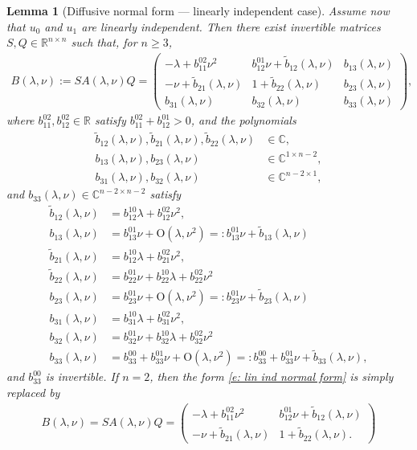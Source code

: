 \documentclass[11pt]{article}
\newcommand{\R}{\mathbb{R}}
\newcommand{\C}{\mathbb{C}}
\newtheorem{lemma}[prop]{Lemma}
\numberwithin{equation}{section}
\numberwithin{prop}{section}
\begin{document}
\begin{lemma}[Diffusive normal form --- linearly independent case]\label{l: lin ind normal form}
	Assume now that $u_0$ and $u_1$ are linearly independent. Then there exist invertible matrices $S, Q \in \R^{n \times n}$ such that, for $n \geq 3$, 
	\begin{align}
	B(\lambda, \nu) := S A(\lambda, \nu) Q = \begin{pmatrix}
	-\lambda + b_{11}^{02} \nu^2 & b_{12}^{01} \nu + \tilde{b}_{12}(\lambda, \nu) & b_{13}(\lambda, \nu) \\
	- \nu + \tilde{b}_{21}(\lambda, \nu) & 1 + \tilde{b}_{22} (\lambda, \nu) & b_{23}(\lambda, \nu) \\
	b_{31}(\lambda, \nu) & b_{32}(\lambda, \nu) & b_{33}(\lambda, \nu) 
	\end{pmatrix}, \label{e: lin ind normal form}
	\end{align}
	where $b_{11}^{02}, b_{12}^{02} \in \R$ satisfy $b_{11}^{02} + b_{12}^{01} > 0$, and the polynomials
	\begin{align*}
	\tilde{b}_{12}(\lambda, \nu), \tilde{b}_{21}(\lambda, \nu), \tilde{b}_{22}(\lambda, \nu) &\in \C, \\
	b_{13}(\lambda, \nu), b_{23} (\lambda, \nu) &\in \C^{1 \times n-2}, \\
	b_{31}(\lambda, \nu), b_{32} (\lambda, \nu) &\in \C^{n-2 \times 1}, 
	\end{align*}
	and $b_{33}(\lambda, \nu) \in \C^{n-2 \times n-2}$ satisfy
	\begin{align}
	\tilde{b}_{12} (\lambda, \nu) &= b_{12}^{10} \lambda + b_{12}^{02} \nu^2, \\
	b_{13} (\lambda, \nu) &= b_{13}^{01} \nu + \mathrm{O}(\lambda, \nu^2) =: b_{13}^{01} \nu + \tilde{b}_{13}(\lambda, \nu) \\
	\tilde{b}_{21} (\lambda, \nu) &= b_{12}^{10} \lambda + b_{21}^{02} \nu^2, \\
	\tilde{b}_{22} (\lambda, \nu) &= b_{22}^{01} \nu + b_{22}^{10} \lambda + b_{22}^{02} \nu^2  \\
	b_{23} (\lambda, \nu) &= b_{23}^{01} \nu + \mathrm{O}(\lambda, \nu^2) =: b_{23}^{01} \nu + \tilde{b}_{23} (\lambda, \nu) \\
	b_{31} (\lambda, \nu) &= b_{31}^{10} \lambda + b_{31}^{02} \nu^2 , \\
	b_{32} (\lambda, \nu) &= b_{32}^{01} \nu + b_{32}^{10} \lambda + b_{32}^{02} \nu^2 \\
	b_{33}(\lambda, \nu) &= b_{33}^{00} + b_{33}^{01} \nu + \mathrm{O}(\lambda, \nu^2) =: b_{33}^{00} + b_{33}^{01} \nu + \tilde{b}_{33} (\lambda, \nu),
	\end{align}
	and $b_{33}^{00}$ is invertible. If $n = 2$, then the form \eqref{e: lin ind normal form} is simply replaced by
	\begin{align}
	B(\lambda, \nu) = S A(\lambda, \nu) Q = \begin{pmatrix}
	- \lambda + b_{11}^{02} \nu^2 & b_{12}^{01} \nu + \tilde{b}_{12}(\lambda, \nu) \\
	-\nu + \tilde{b}_{21}(\lambda, \nu) & 1 + \tilde{b}_{22}(\lambda, \nu). 
	\end{pmatrix}
	\end{align}
\end{lemma}
\end{document}
